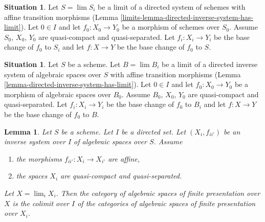 \documentclass{amsart}
\theoremstyle{plain}
\newtheorem{lemma}[subsection]{Lemma}
\theoremstyle{definition}
\newtheorem{situation}[subsection]{Situation}
\theoremstyle{remark}
\numberwithin{equation}{subsection}
\def\lim{\mathop{\mathrm{lim}}\nolimits}
\begin{document}
\begin{situation}
\label{limits-situation-descent-property}
Let $S = \lim S_i$ be a limit of a directed system of schemes
with affine transition morphisms
(Lemma \ref{limits-lemma-directed-inverse-system-has-limit}).
Let $0 \in I$ and let $f_0 : X_0 \to Y_0$ be a morphism of schemes over $S_0$.
Assume $S_0$, $X_0$, $Y_0$ are quasi-compact and quasi-separated.
Let $f_i : X_i \to Y_i$ be the base change of $f_0$ to $S_i$ and
let $f : X \to Y$ be the base change of $f_0$ to $S$.
\end{situation}

\begin{situation}
\label{situation-descent-property}
Let $S$ be a scheme. Let $B = \lim B_i$ be a limit of a directed inverse system
of algebraic spaces over $S$ with affine transition morphisms
(Lemma \ref{lemma-directed-inverse-system-has-limit}).
Let $0 \in I$ and let $f_0 : X_0 \to Y_0$ be a morphism of algebraic spaces
over $B_0$. Assume $B_0$, $X_0$, $Y_0$ are quasi-compact and quasi-separated.
Let $f_i : X_i \to Y_i$ be the base change of $f_0$ to $B_i$ and
let $f : X \to Y$ be the base change of $f_0$ to $B$.
\end{situation}

\begin{lemma}
\label{lemma-descend-finite-presentation}
Let $S$ be a scheme. Let $I$ be a directed set.
Let $(X_i, f_{ii'})$ be an inverse system over $I$ of algebraic spaces
over $S$. Assume
\begin{enumerate}
\item the morphisms $f_{ii'} : X_i \to X_{i'}$ are affine,
\item the spaces $X_i$ are quasi-compact and quasi-separated.
\end{enumerate}
Let $X = \lim_i X_i$. Then the category of algebraic spaces
of finite presentation over $X$ is the colimit over $I$ of the
categories of algebraic spaces of finite presentation over $X_i$.
\end{lemma}
\end{document}
